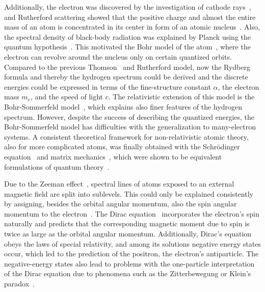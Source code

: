Additionally, the electron was discovered by the investigation of cathode rays~\cite{thomson1897,rechenberg1997}, and Rutherford scattering showed that the positive charge and almost the entire mass of an atom is concentrated in its center in form of an atomic nucleus~\cite{rutherford1911}. Also, the spectral density of black-body radiation was explained by Planck using the quantum hypothesis~\cite{planck1978}. This motivated the Bohr model of the atom~\cite{bohr1913}, where the electron can revolve around the nucleus only on certain quantized orbits. Compared to the previous Thomson~\cite{thomson1904} and Rutherford model, now the Rydberg formula and thereby the hydrogen spectrum could be derived and the discrete energies could be expressed in terms of the fine-structure constant $\alpha$, the electron mass $m_e$, and the speed of light $c$. The relativistic extension of this model is the Bohr-Sommerfeld model~\cite{sommerfeld1916}, which explains also finer features of the hydrogen spectrum.
However, despite the success of describing the quantized energies, the Bohr-Sommerfeld model has difficulties with the generalization to many-electron systems. A consistent theoretical framework for non-relativistic atomic theory, also for more complicated atoms, was finally obtained with the Schrödinger equation~\cite{schrodinger1926_1,schrodinger1926_2,schrodinger1926_3,schrodinger1926_4} and matrix mechanics~\cite{heisenberg1925,born1925,born1926}, which were shown to be equivalent formulations of quantum theory~\cite{schrodinger1926_5}.

Due to the Zeeman effect~\cite{zeeman1896}, spectral lines of atoms exposed to an external magnetic field are split into sublevels. This could only be explained consistently by assigning, besides the orbital angular momentum, also the spin angular momentum to the electron~\cite{uhlenbeck1925}. The Dirac equation~\cite{dirac1928} incorporates the electron's spin naturally and predicts that the corresponding magnetic moment due to spin is twice as large as the orbital angular momentum. Additionally, Dirac's equation obeys the laws of special relativity, and among its solutions negative energy states occur, which led to the prediction of the positron, the electron's antiparticle. The negative-energy states also lead to problems with the one-particle interpretation of the Dirac equation due to phenomena such as the Zitterbewegung or Klein's paradox~\cite{the_dirac_eq}.
 
